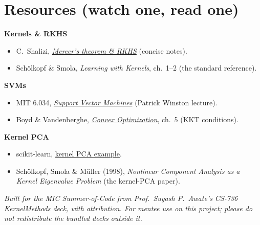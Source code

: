 \documentclass[11pt]{article}
\begin{document}
\section*{Resources (watch one, read one)}

\textbf{Kernels \& RKHS}
\begin{itemize}[nosep,leftmargin=*]
  \item C.\ Shalizi, \href{https://www.stat.cmu.edu/~cshalizi/350/lectures/16/lecture-16.pdf}{\emph{Mercer's theorem \& RKHS}} (concise notes).
  \item Sch\"olkopf \& Smola, \emph{Learning with Kernels}, ch.~1--2 (the standard reference).
\end{itemize}

\textbf{SVMs}
\begin{itemize}[nosep,leftmargin=*]
  \item MIT 6.034, \href{https://www.youtube.com/watch?v=_PwhiWxHK8o}{\emph{Support Vector Machines}} (Patrick Winston lecture).
  \item Boyd \& Vandenberghe, \href{https://web.stanford.edu/~boyd/cvxbook/}{\emph{Convex Optimization}}, ch.~5 (KKT conditions).
\end{itemize}

\textbf{Kernel PCA}
\begin{itemize}[nosep,leftmargin=*]
  \item scikit-learn, \href{https://scikit-learn.org/stable/auto_examples/decomposition/plot_kernel_pca.html}{kernel PCA example}.
  \item Sch\"olkopf, Smola \& M\"uller (1998), \emph{Nonlinear Component Analysis as a Kernel Eigenvalue Problem} (the kernel-PCA paper).
\end{itemize}

\vfill
\begin{center}\small\itshape
Built for the MIC Summer-of-Code from Prof.\ Suyash P.\ Awate's CS-736
KernelMethods deck, with attribution. For mentee use on this project; please do
not redistribute the bundled decks outside it.
\end{center}
\end{document}
